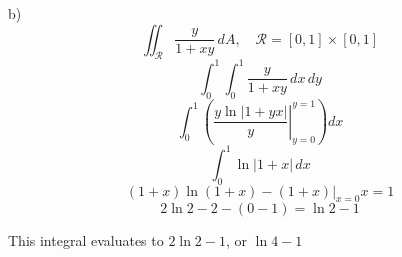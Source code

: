 \documentclass[hidelinks]{article}
\begin{document}
b)
\[
	\iint_{\mathcal{R}} \frac{y}{1+xy} \, dA, \quad \mathcal{R} = [0,1] \times [0,1]
\]
\[
	\int_0^1 \int_0^1 \frac{y}{1+xy} \,dx \, dy
\]
\[
	\int_0^1 \left(\left . \frac{y \ln|1+yx|}{y} \right |_{y = 0}^{y = 1}\right)dx
\]
\[
	\int_0^1 \ln|1+x| \,dx
\]
\[
	(1+x)\ln(1+x) - (1+x) \Big |_{x = 0 }{x = 1}
\]
\[
	2\ln2 - 2 - (0 - 1) = \ln2 -1
\]

This integral evaluates to $2\ln2 - 1$, or $\ln4 - 1$
\end{document}
